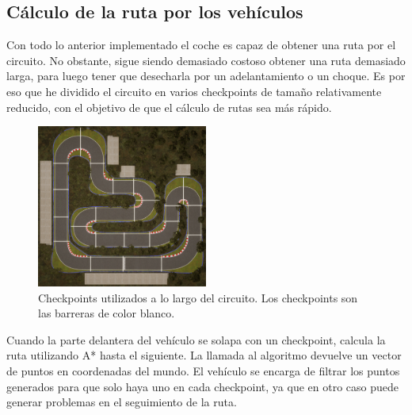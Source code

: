 


\subsection{Cálculo de la ruta por los vehículos}

Con todo lo anterior implementado el coche es capaz de obtener una ruta por el circuito. No obstante, sigue siendo demasiado costoso obtener una ruta demasiado larga, para luego tener que desecharla por un adelantamiento o un choque. Es por eso que he dividido el circuito en varios checkpoints de tamaño relativamente reducido, con el objetivo de que el cálculo de rutas sea más rápido.


\begin{figure}[H]
    \centering
    \includegraphics[width=0.5\textwidth]{imagenes/checkpoints.png}
    \caption{Checkpoints utilizados a lo largo del circuito. Los checkpoints son las barreras de color blanco.}
    \label{fig:checkpointunreal}
\end{figure}

Cuando la parte delantera del vehículo se solapa con un checkpoint, calcula la ruta utilizando A* hasta el siguiente. La llamada al algoritmo devuelve un vector de puntos en coordenadas del mundo. El vehículo se encarga de filtrar los puntos generados para que solo haya uno en cada checkpoint, ya que en otro caso puede generar problemas en el seguimiento de la ruta.

